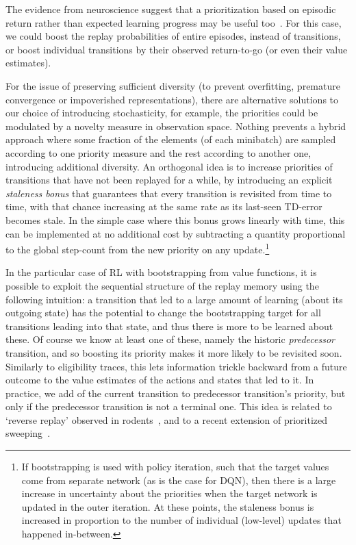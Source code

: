 \documentclass[a4paper]{article}
\begin{document}
The evidence from neuroscience suggest that a prioritization based on episodic return rather than expected learning progress may be useful too~\cite{dharsh1,dharsh2,dharsh3}. For this case, we could boost the replay probabilities of entire episodes, instead of transitions, or boost individual transitions by their observed return-to-go (or even their value estimates).


For the issue of preserving sufficient diversity (to prevent overfitting, premature convergence or impoverished representations), 
there are alternative solutions 
to our choice of introducing stochasticity, for example, the priorities could be modulated
by a novelty measure in observation space. 
Nothing prevents a hybrid approach where some fraction of the elements (of each minibatch) are sampled according to one priority measure and the rest according to another one, introducing additional diversity.
An orthogonal idea is to increase priorities of transitions that have not been 
replayed for a while, by introducing an explicit \emph{staleness bonus} that guarantees that every transition 
is revisited from time to time, with that chance increasing at the same rate as its last-seen
TD-error becomes stale.
In the simple case where this bonus grows linearly with time, 
this can be implemented at no additional cost by subtracting a quantity proportional to the global step-count from the new priority on any update.\footnote{
If bootstrapping is used with policy iteration, such that the target values come from separate network (as is the case for DQN), 
then there is a large increase in uncertainty about the priorities when the target network is updated in the outer iteration.
At these points, the staleness bonus is increased in proportion to the number of individual (low-level) updates
that happened in-between.
}



In the particular case of RL with bootstrapping from value functions, it is possible to exploit the sequential structure 
of the replay memory using the following intuition:
a transition that led to a large amount of learning (about its outgoing state) 
has the potential to change the bootstrapping target for all transitions leading into that state, and
thus there is more to be learned about these. 
Of course we know at least one of these, namely the historic \emph{predecessor} transition,
and so boosting its priority makes it more likely to be revisited soon.
Similarly to eligibility traces, this lets information trickle backward from a future outcome to
the value estimates of the actions and states that led to it.
In practice, we add  of the current transition to predecessor transition's priority, but only if the predecessor transition
is not a terminal one. This idea is related to `reverse replay' observed in rodents~\cite{dharsh3}, and to a recent extension of prioritized sweeping~\citep{harm}.
\end{document}
